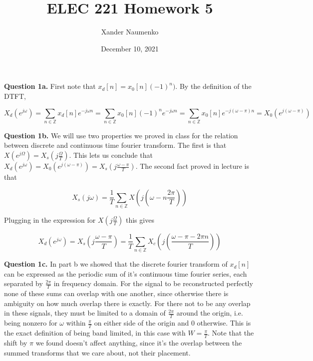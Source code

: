 \documentclass[letterpaper, reqno,11pt]{article}
\newcommand{\ZZ}{\mathbb{Z}}
\begin{document}
\title{ELEC 221 Homework 5}
\date{December 10, 2021}
\author{Xander Naumenko}
\maketitle

{\noindent\bf Question 1a.} First note that $x_d[n]=x_0[n](-1)^n)$. By the definition of the DTFT, 


\[
    X_d(e^{j\omega})=\sum_{n\in\ZZ}x_d[n]e^{-j\omega n}=\sum_{n\in\ZZ}x_0[n] (-1)^ne^{-j\omega n}=\sum_{n\in\ZZ}x_0[n] e^{-j(\omega -\pi)n}=X_0(e^{j(\omega-\pi)})
\]







{\noindent\bf Question 1b.} We will use two properties we proved in class for the relation between discrete and continuous time fourier transform. The first is that $X(e^{j\Omega})=X_s(j\frac{\Omega}{T})$. This lets us conclude that $X_d(e^{j\omega})=X_0(e^{j(\omega-\pi)})=X_s(j\frac{\omega-\pi}{T})$. The second fact proved in lecture is that 

\[
    X_s(j\omega)=\frac1T\sum_{n\in\ZZ} X(j(\omega-n\frac{2\pi}T))
\]

Plugging in the expression for $X(j\frac{\Omega}T)$ this gives 

\[
    X_d(e^{j\omega})=X_s(j\frac{\omega-\pi}T)=\frac1T\sum_{n\in\ZZ} X_c(j(\frac{\omega-\pi-2\pi n}T))
\]

{\noindent\bf Question 1c.} In part b we showed that the discrete fourier transform of $x_d[n]$ can be expressed as the periodic sum of it's continuous time fourier series, each separated by $\frac{2\pi}T$ in frequency domain. For the signal to be reconstructed perfectly none of these sums can overlap with one another, since otherwise there is ambiguity on how much overlap there is exactly. For there not to be any overlap in these signals, they must be limited to a domain of $\frac {2\pi}T$ around the origin, i.e. being nonzero for $\omega$ within $\frac \pi T$ on either side of the origin and $0$ otherwise. This is the exact definition of being band limited, in this case with $W=\frac \pi T$. Note that the shift by $\pi$ we found doesn't affect anything, since it's the overlap between the summed transforms that we care about, not their placement. 
\end{document}
